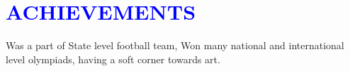 \documentclass{article}
\begin{document}
\section*{\large{\textcolor{blue}{\uppercase{achievements}}}}

\vspace{4pt}
	Was a part of State level football team, Won many national and international level olympiads, having a soft corner towards art. 

\vspace{3pt}
\end{document}
